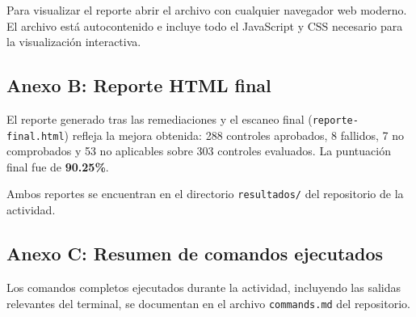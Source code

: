 \documentclass[12pt,letterpaper]{article}
\begin{document}
Para visualizar el reporte abrir el archivo con cualquier navegador web moderno. El archivo está autocontenido e incluye todo el JavaScript y CSS necesario para la visualización interactiva.

\subsection*{Anexo B: Reporte HTML final}

El reporte generado tras las remediaciones y el escaneo final (\texttt{reporte-final.html}) refleja la mejora obtenida: 288 controles aprobados, 8 fallidos, 7 no comprobados y 53 no aplicables sobre 303 controles evaluados. La puntuación final fue de \textbf{90.25\%}.

Ambos reportes se encuentran en el directorio \texttt{resultados/} del repositorio de la actividad.

\subsection*{Anexo C: Resumen de comandos ejecutados}

Los comandos completos ejecutados durante la actividad, incluyendo las salidas relevantes del terminal, se documentan en el archivo \texttt{commands.md} del repositorio.
\end{document}
